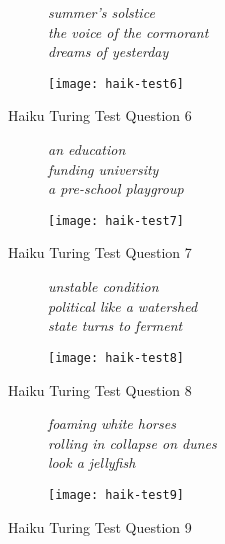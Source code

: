 \begin{figure}[H]
\centering
\begin{subfigure}[t!]{0.45\textwidth}
	\centering
    \textit{summer's solstice\\the voice of the cormorant\\dreams of yesterday}
\end{subfigure}
\begin{subfigure}[t!]{0.45\textwidth}
	\centering
    \texttt{[image: haik-test6]}
\end{subfigure}
\caption{Haiku Turing Test Question 6}
\label{fig:haik-test6}
\end{figure}

\begin{figure}[H]
\centering
\begin{subfigure}[t!]{0.45\textwidth}
	\centering
    \textit{an education\\funding university\\a pre-school playgroup}
\end{subfigure}
\begin{subfigure}[t!]{0.45\textwidth}
	\centering
    \texttt{[image: haik-test7]}
\end{subfigure}
\caption{Haiku Turing Test Question 7}
\label{fig:haik-test7}
\end{figure}

\begin{figure}[H]
\centering
\begin{subfigure}[t!]{0.45\textwidth}
	\centering
    \textit{unstable condition\\political like a watershed\\state turns to ferment}
\end{subfigure}
\begin{subfigure}[t!]{0.45\textwidth}
	\centering
    \texttt{[image: haik-test8]}
\end{subfigure}
\caption{Haiku Turing Test Question 8}
\label{fig:haik-test8}
\end{figure}

\begin{figure}[H]
\centering
\begin{subfigure}[t!]{0.45\textwidth}
	\centering
    \textit{foaming white horses\\rolling in collapse on dunes\\look a jellyfish}
\end{subfigure}
\begin{subfigure}[t!]{0.45\textwidth}
	\centering
    \texttt{[image: haik-test9]}
\end{subfigure}
\caption{Haiku Turing Test Question 9}
\label{fig:haik-test9}
\end{figure}

